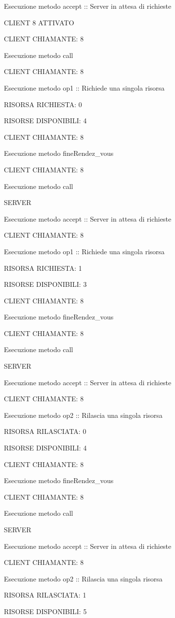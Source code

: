 \documentclass[10pt, a4paper]{article}
\begin{document}
Esecuzione metodo accept :: Server in attesa di richieste

CLIENT 8 ATTIVATO

CLIENT CHIAMANTE: 8

Esecuzione metodo call

CLIENT CHIAMANTE: 8

Esecuzione metodo op1 :: Richiede una singola risorsa

RISORSA RICHIESTA: 0

RISORSE DISPONIBILI: 4

CLIENT CHIAMANTE: 8

Esecuzione metodo fineRendez\_vous

CLIENT CHIAMANTE: 8

Esecuzione metodo call

SERVER

Esecuzione metodo accept :: Server in attesa di richieste

CLIENT CHIAMANTE: 8

Esecuzione metodo op1 :: Richiede una singola risorsa

RISORSA RICHIESTA: 1

RISORSE DISPONIBILI: 3

CLIENT CHIAMANTE: 8

Esecuzione metodo fineRendez\_vous

CLIENT CHIAMANTE: 8

Esecuzione metodo call

SERVER

Esecuzione metodo accept :: Server in attesa di richieste

CLIENT CHIAMANTE: 8

Esecuzione metodo op2 :: Rilascia una singola risorsa

RISORSA RILASCIATA: 0

RISORSE DISPONIBILI: 4

CLIENT CHIAMANTE: 8

Esecuzione metodo fineRendez\_vous


CLIENT CHIAMANTE: 8

Esecuzione metodo call

SERVER

Esecuzione metodo accept :: Server in attesa di richieste

CLIENT CHIAMANTE: 8

Esecuzione metodo op2 :: Rilascia una singola risorsa

RISORSA RILASCIATA: 1

RISORSE DISPONIBILI: 5
\end{document}
